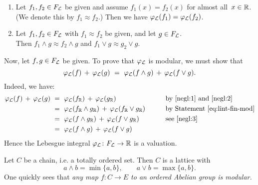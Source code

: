 \documentclass[main.tex]{subfiles}
\begin{document}
\begin{ex}
\begin{enumerate}
\item
\label{negl:2}
Let $f_1,f_2 \in F_{\mathcal{L}}$
be given and assume $f_1(x) = f_2(x)$
for almost all~$x\in \mathbb{R}$.
(We denote this by $f_1 \approx f_2$.)
Then we have  $\varphi_{\mathcal{L}}(f_1) = \varphi_{\mathcal{L}}(f_2)$.

\item
\label{negl:3}
Let $f_1,f_2\in F_{\mathcal{L}}$ with $f_1 \approx f_2$ be given,
and let $g\in F_{\mathcal{L}}$.\\
Then $f_1 \wedge g \approx f_2 \wedge g$
and $f_1 \vee g \approx g_2 \vee g$.
\end{enumerate}
Now,
let $f,g\in F_{\mathcal{L}}$ be given.
To prove that $\varphi_{\mathcal{L}}$ is modular,
we must show that 
\begin{equation*}
\Lphi(f)\,+\,\Lphi(g) \ =\  \Lphi(f\wedge g) \,+\, \Lphi(f\vee g).
\end{equation*}
Indeed, we have:
\begin{alignat*}{3}
\varphi_{\mathcal{L}}(f) \,+\, \varphi_{\mathcal{L}}(g) 
  \ &=\  \varphi_{\mathcal{L}}(f_{\mathbb{R}}) \,+\, \varphi_{\mathcal{L}}(g_{\mathbb{R}})
    \qquad&&\text{by \ref{negl:1} and \ref{negl:2}}\\
  \ &=\ \varphi_{\mathcal{L}}(f_{\mathbb{R}}\wedge g_{\mathbb{R}}) \,+\, \varphi_{\mathcal{L}}(f_{\mathbb{R}} \vee g_{\mathbb{R}}) 
    \qquad&&\text{by Statement~\eqref{eq:lint-fin-mod}}\\
  \ &=\ \varphi_{\mathcal{L}}(f\wedge g_{\mathbb{R}}) \,+\, \varphi_{\mathcal{L}}(f \vee g_{\mathbb{R}})
    \qquad&&\text{see \ref{negl:3}}\\
  \ &=\ \varphi_{\mathcal{L}}(f\wedge g) \,+\, \varphi_{\mathcal{L}}(f \vee g)
    \qquad&&
\end{alignat*}
Hence the Lebesgue integral $\varphi_{\mathcal{L}}\colon F_{\mathcal{L}}\rightarrow \mathbb{R}$ is a valuation.
\end{ex}

%
%
\begin{ex}
Let $C$ be a chain,
i.e. a totally ordered set.
Then $C$ is a lattice with
\begin{equation*}
a\wedge b = \min\{a,b\},
 \qquad 
a\vee b = \max\{a,b\}.
\end{equation*}
One quickly sees that
\emph{any map $f\colon C\rightarrow E$
to an ordered Abelian group is modular.}
\end{ex}
\end{document}
